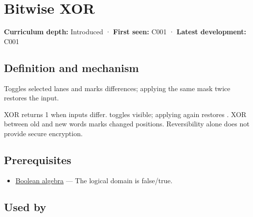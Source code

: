 \hypertarget{appendix-d49161831368}{}\label{referencestart:appendix-d49161831368}
\section{Bitwise XOR}\label{appendix-d49161831368-bitwise-xor}

\hypertarget{appendix-d49161831368-bitwise-xor}{}

\textbf{Curriculum depth:} Introduced · \textbf{First seen:} C001 · \textbf{Latest development:} C001

\begin{allmightroledefinition}

\subsection{Definition and mechanism}\label{appendix-d49161831368-definition-and-mechanism}

\hypertarget{appendix-d49161831368-definition-and-mechanism}{}

Toggles selected lanes and marks differences; applying the same mask twice restores the input.

\end{allmightroledefinition}

XOR returns 1 when inputs differ.  toggles visible; applying  again restores . XOR between old and new words marks changed positions. Reversibility alone does not provide secure encryption.

\subsection{Prerequisites}\label{appendix-d49161831368-prerequisites}

\hypertarget{appendix-d49161831368-prerequisites}{}

\begin{itemize}
\tightlist
\item
  \hyperref[appendix-24475e1596a8]{Boolean algebra} --- The logical domain is false/true.
\end{itemize}

\subsection{Used by}\label{appendix-d49161831368-used-by}

\hypertarget{appendix-d49161831368-used-by}{}

